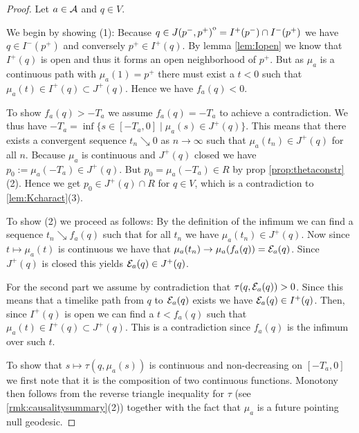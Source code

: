 \begin{proof}
Let $a\in {\mathcal{A}}$ and $q\in V$.

We begin by showing (1): 
Because $q \in {\kern0ptJ(p^-,p^+)}^{\mathrm{o}} = I^+(p^-)\cap I^-(p^+)$ we have $q\in I^-(p^+)$ and conversely $p^+\in I^+(q)$. By lemma \ref{lem:Iopen} we know that $I^+(q)$ is open and thus it forms an open neighborhood of $p^+$. But as $\mu_a$ is a continuous path with $\mu_a(1)=p^+$ there must exist a $t<0$ such that $\mu_a(t)\in I^+(q)\subset J^+(q)$. Hence we have $f_a(q)<0$.

To show $f_a(q)>-T_a$ we assume $f_a(q)=-T_a$ to achieve a contradiction. We thus have $-T_a=\inf \{s\in [-T_a,0] \mid \mu_a(s)\in J^+(q)\}$. This means that there exists a convergent sequence $t_n\searrow 0$ as $n\to \infty$ such that $\mu_a(t_n)\in J^+(q)$ for all $n$. Because $\mu_a$ is continuous and $J^+(q)$ closed we have $p_0:=\mu_a(-T_a)\in J^+(q)$. But $p_0=\mu_a(-T_a)\in R$ by prop \ref{prop:thetaconstr}(2). Hence we get $p_0\in J^+(q) \cap R$ for $q\in V$, which is a contradiction to \ref{lem:Kcharact}(3).

To show (2) we proceed as follows:
By the definition of the infimum we can find a sequence $t_n\searrow f_a(q)$ such that for all $t_n$ we have $\mu_a(t_n)\in J^+(q)$. Now since $t\mapsto \mu_a(t)$ is continuous we have that $\mu_a(t_n)\to \mu_a(f_a(q)) = {\mathcal{E}}_a(q)$. Since $J^+(q)$ is closed this yields ${\mathcal{E}}_a(q)\in J^+(q)$. 

For the second part we assume by contradiction that $\tau(q,{\mathcal{E}}_a(q)) > 0$. Since this means that a timelike path from $q$ to ${\mathcal{E}}_a(q)$ exists we have ${\mathcal{E}}_a(q)\in I^+(q)$. Then, since $I^+(q)$ is open we can find a $t<f_a(q)$ such that $\mu_a(t)\in I^+(q) \subset J^+(q)$. This is a contradiction since $f_a(q)$ is the infimum over such $t$.

To show that $s\mapsto \tau(q,\mu_a(s))$ is continuous and non-decreasing on $[-T_a,0]$ we first note that it is the composition of two continuous functions. Monotony then follows from the reverse triangle inequality for $\tau$ (see \ref{rmk:causalitysummary}(2)) together with the fact that $\mu_a$ is a future pointing null geodesic.


\end{proof}
